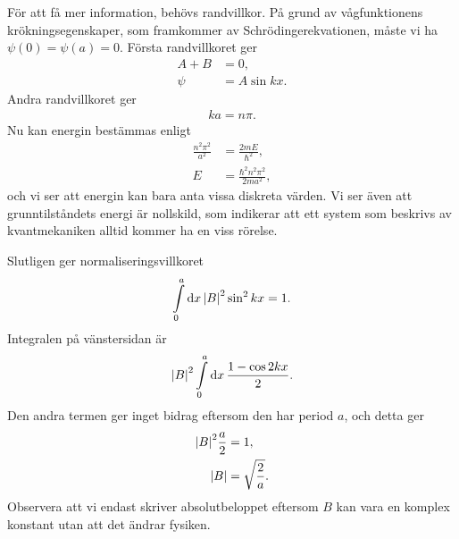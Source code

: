 För att få mer information, behövs randvillkor. På grund av vågfunktionens krökningsegenskaper, som framkommer av Schrödingerekvationen, måste vi ha $\psi(0) = \psi(a) = 0$. Första randvillkoret ger
\begin{align*}
	A + B &= 0, \\
	\psi  &= A\sin{kx}.
\end{align*}
Andra randvillkoret ger
\begin{align*}
	ka = n\pi.
\end{align*}
Nu kan energin bestämmas enligt
\begin{align*}
	\frac{n^{2}\pi^{2}}{a^{2}} &= \frac{2mE}{\hbar^{2}}, \\
	E                          &= \frac{\hbar^{2}n^{2}\pi^{2}}{2ma^{2}},
\end{align*}
och vi ser att energin kan bara anta vissa diskreta värden. Vi ser även att grunntilståndets energi är nollskild, som indikerar att ett system som beskrivs av kvantmekaniken alltid kommer ha en viss rörelse.

Slutligen ger normaliseringsvillkoret
\begin{align*}
	\int\limits_{0}^{a}\dd{x}\abs{B}^{2}\sin^{2}{kx} = 1.
\end{align*}
Integralen på vänstersidan är
\begin{align*}
	\abs{B}^{2}\int\limits_{0}^{a}\dd{x}\frac{1 - \cos{2kx}}{2}.
\end{align*}
Den andra termen ger inget bidrag eftersom den har period $a$, och detta ger
\begin{align*}
	\abs{B}^{2}\frac{a}{2} &= 1, \\
	\abs{B}                &= \sqrt{\frac{2}{a}}.
\end{align*}
Observera att vi endast skriver absolutbeloppet eftersom $B$ kan vara en komplex konstant utan att det ändrar fysiken.

